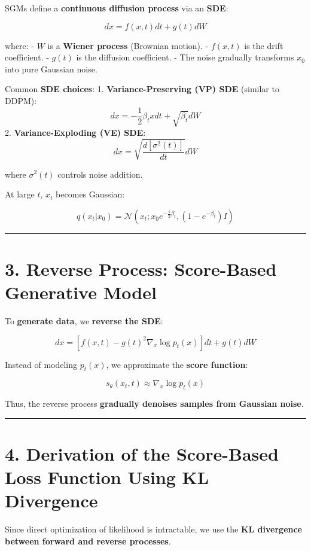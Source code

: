 \documentclass[
]{book}
\begin{document}
SGMs define a \textbf{continuous diffusion process} via an \textbf{SDE}:

\[
dx = f(x, t) dt + g(t) dW
\]

where:
- \(W\) is a \textbf{Wiener process} (Brownian motion).
- \(f(x, t)\) is the drift coefficient.
- \(g(t)\) is the diffusion coefficient.
- The noise gradually transforms \(x_0\) into pure Gaussian noise.

Common \textbf{SDE choices}:
1. \textbf{Variance-Preserving (VP) SDE} (similar to DDPM):
\[
   dx = -\frac{1}{2} \beta_t x dt + \sqrt{\beta_t} dW
   \]
2. \textbf{Variance-Exploding (VE) SDE}:
\[
   dx = \sqrt{\frac{d[\sigma^2(t)]}{dt}} dW
   \]

where \(\sigma^2(t)\) controls noise addition.

At large \(t\), \(x_t\) becomes Gaussian:

\[
q(x_t | x_0) = \mathcal{N}(x_t ; x_0 e^{-\frac{1}{2} \beta_t}, (1 - e^{-\beta_t}) I)
\]

\begin{center}\rule{0.5\linewidth}{0.5pt}\end{center}

\chapter{3. Reverse Process: Score-Based Generative Model}\label{reverse-process-score-based-generative-model}

To \textbf{generate data}, we \textbf{reverse the SDE}:

\[
dx = [f(x,t) - g(t)^2 \nabla_x \log p_t(x)] dt + g(t) dW
\]

Instead of modeling \(p_t(x)\), we approximate the \textbf{score function}:

\[
s_\theta(x_t, t) \approx \nabla_x \log p_t(x)
\]

Thus, the reverse process \textbf{gradually denoises samples from Gaussian noise}.

\begin{center}\rule{0.5\linewidth}{0.5pt}\end{center}

\chapter{4. Derivation of the Score-Based Loss Function Using KL Divergence}\label{derivation-of-the-score-based-loss-function-using-kl-divergence}

Since direct optimization of likelihood is intractable, we use the \textbf{KL divergence between forward and reverse processes}.
\end{document}
